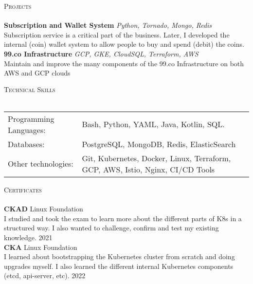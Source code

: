 \documentclass[a4paper]{article}
\newcommand{\lineunder} {
    \vspace*{-8pt} \\
    \hspace*{-18pt} \hrulefill \\
}
\newcommand{\header} [1] {
    {\hspace*{-18pt}\vspace*{6pt} \textsc{#1}}
    \vspace*{-6pt} \lineunder
}
\begin{document}
\header{Projects}
{\textbf{Subscription and Wallet System}} {\sl Python, Tornado, Mongo, Redis} \\
Subscription service is a critical part of the business. Later, I developed the internal (coin) wallet system to allow people to buy and spend (debit) the coins.\\
\vspace*{2mm}
{\textbf{99.co Infrastructure}} {\sl GCP, GKE, CloudSQL, Terraform, AWS} \\
Maintain and improve the many components of the 99.co Infrastructure on both AWS and GCP clouds\\
\vspace*{2mm}

\header{Technical Skills}
\begin{tabular}{ l l }
	Programming Languages: & Bash, Python, YAML, Java, Kotlin, SQL.                                         \\
	Databases:             & PostgreSQL, MongoDB, Redis, ElasticSearch                                      \\
	Other technologies:    & Git, Kubernetes, Docker, Linux, Terraform, GCP, AWS, Istio, Nginx, CI/CD Tools \\
\end{tabular}
\vspace{2mm}

\header{Certificates}
\textbf{CKAD} \hfill Linux Foundation\\
I studied and took the exam to learn more about the different parts of K8s in a structured way. I also wanted to challenge, confirm and test my existing knowledge. \hfill 2021\\
\vspace*{2mm}
\textbf{CKA} \hfill Linux Foundation\\
I learned about bootstrapping the Kubernetes cluster from scratch and doing upgrades myself. I also learned the different internal Kubernetes components (etcd, api-server, etc). \hfill 2022\\
\vspace*{2mm}

\ 
\end{document}

